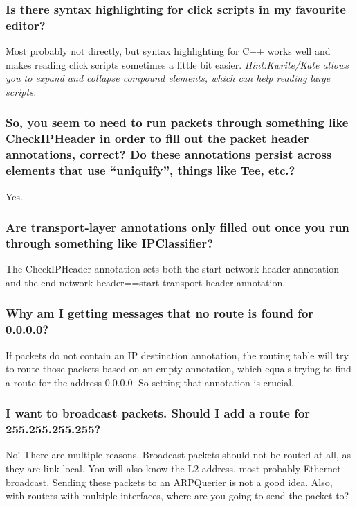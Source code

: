 \documentclass[a4paper]{article}
\begin{document}
\subsubsection*{Is there syntax highlighting for click scripts in my favourite editor?}

Most probably not directly, but syntax highlighting for C++ works well
and makes reading click scripts sometimes a little bit easier.
\emph{Hint:Kwrite/Kate allows you to expand and collapse compound
elements, which can help reading large scripts.}

\subsubsection*{So, you seem to need to run packets through something like CheckIPHeader
in order to fill out the packet header annotations, correct? Do these
annotations persist across elements that use ``uniquify'', things like
Tee, etc.?}

Yes.

\subsubsection*{Are transport-layer annotations only filled out once you run through
something like IPClassifier?}

The CheckIPHeader annotation sets both the start-network-header
annotation and the end-network-header==start-transport-header
annotation.

\subsubsection*{Why am I getting messages that no route is found for 0.0.0.0?}

If packets do not contain an IP destination annotation, the routing
table will try to route those packets based on an empty annotation,
which equals trying to find a route for the address 0.0.0.0. So setting
that annotation is crucial.

\subsubsection*{I want to broadcast packets. Should I add a route for 255.255.255.255?}

No! There are multiple reasons. Broadcast packets should not be routed
at all, as they are link local. You will also know the L2 address, most
probably Ethernet broadcast. Sending these packets to an ARPQuerier is
not a good idea. Also, with routers with multiple interfaces, where are
you going to send the packet to?
\end{document}
